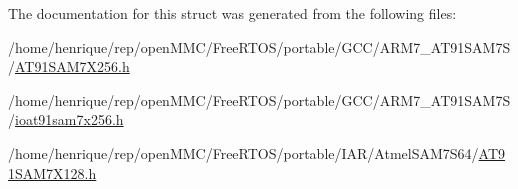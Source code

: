 The documentation for this struct was generated from the following files\-:\begin{DoxyCompactItemize}
\item 
/home/henrique/rep/open\-M\-M\-C/\-Free\-R\-T\-O\-S/portable/\-G\-C\-C/\-A\-R\-M7\-\_\-\-A\-T91\-S\-A\-M7\-S/\hyperlink{GCC_2ARM7__AT91SAM7S_2AT91SAM7X256_8h}{A\-T91\-S\-A\-M7\-X256.\-h}\item 
/home/henrique/rep/open\-M\-M\-C/\-Free\-R\-T\-O\-S/portable/\-G\-C\-C/\-A\-R\-M7\-\_\-\-A\-T91\-S\-A\-M7\-S/\hyperlink{ioat91sam7x256_8h}{ioat91sam7x256.\-h}\item 
/home/henrique/rep/open\-M\-M\-C/\-Free\-R\-T\-O\-S/portable/\-I\-A\-R/\-Atmel\-S\-A\-M7\-S64/\hyperlink{AT91SAM7X128_8h}{A\-T91\-S\-A\-M7\-X128.\-h}\end{DoxyCompactItemize}
